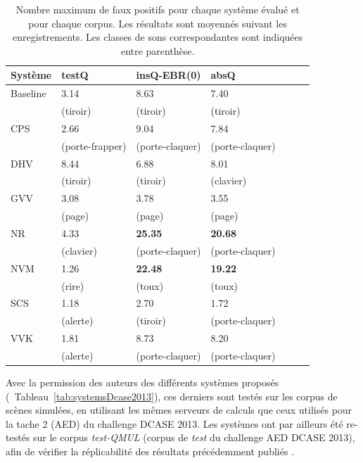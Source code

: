 \begin{table}
\begin{center} 
\begin{tabular}{lllllll}  
  Système &   testQ         &  insQ-EBR(0)      &   absQ          \\
 \hline
 Baseline & 3.14            &  8.63             &  7.40    \\
          & (tiroir)        &  (tiroir)         & (tiroir) \\
      CPS & 2.66            &  9.04             &  7.84   \\
          & (porte-frapper) & (porte-claquer)   & (porte-claquer) \\
      DHV & 8.44            &  6.88             &  8.01  \\
          & (tiroir)        &  (tiroir)         &  (clavier)  \\
      GVV & 3.08            &  3.78             &  3.55   \\
          & (page)          &  (page)           & (page) \\
      NR  & 4.33            & \textbf{25.35}    & \textbf{20.68}  \\
          & (clavier)       & (porte-claquer)   & (porte-claquer)  \\
      NVM & 1.26            & \textbf{22.48}    & \textbf{19.22}    \\
          & (rire)          & (toux)            & (toux) \\
      SCS & 1.18            &  2.70             &  1.72   \\
          & (alerte)        &  (tiroir)         & (porte-claquer)  \\
      VVK & 1.81            &  8.73             &  8.20   \\ 
          & (alerte)        &  (porte-claquer)  & (porte-claquer) \\
       \hline
\end{tabular}
\end{center} 
\caption[Nombre maximum de faux positifs pour chaque système évalué et pour chaque corpus]{Nombre maximum de faux positifs pour chaque système évalué et pour chaque corpus. Les résultats sont moyennés suivant les enregistrements. Les classes de sons correspondantes sont indiquées entre parenthèse.}
\label{tab:fp}
\end{table}

Avec la permission des auteurs des différents systèmes proposés (\cf~Tableau~\ref{tab:systemsDcase2013}), ces derniers sont testés sur les corpus de scènes simulées, en utilisant les mêmes serveurs de calculs que ceux utilisés pour la tache 2 (AED) du challenge DCASE 2013. Les systèmes ont par ailleurs été re-testés sur le corpus \emph{test-QMUL} (corpus de \emph{test} du challenge AED DCASE 2013), afin de vérifier la réplicabilité des résultats précédemment publiés \citep{Stowell15}.

